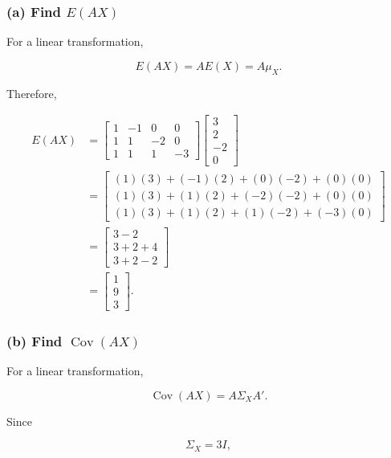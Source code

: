 \documentclass[12pt]{article}
\begin{document}
	\subsubsection*{(a) Find $E(AX)$}
	
	For a linear transformation,
	
	\[
	\boxed{
		E(AX)=AE(X)=A\mu_X
	}.
	\]
	
	Therefore,
	
	\[
	\begin{aligned}
		E(AX)
		&=
		\begin{bmatrix}
			1&-1&0&0\\
			1&1&-2&0\\
			1&1&1&-3
		\end{bmatrix}
		\begin{bmatrix}
			3\\
			2\\
			-2\\
			0
		\end{bmatrix}\\
		&=
		\begin{bmatrix}
			(1)(3)+(-1)(2)+(0)(-2)+(0)(0)\\
			(1)(3)+(1)(2)+(-2)(-2)+(0)(0)\\
			(1)(3)+(1)(2)+(1)(-2)+(-3)(0)
		\end{bmatrix}\\
		&=
		\begin{bmatrix}
			3-2\\
			3+2+4\\
			3+2-2
		\end{bmatrix}\\
		&=
		\boxed{
			\begin{bmatrix}
				1\\
				9\\
				3
			\end{bmatrix}
		}.
	\end{aligned}
	\]
	
	
	\subsubsection*{(b) Find $\operatorname{Cov}(AX)$}
	
	For a linear transformation,
	
	\[
	\boxed{
		\operatorname{Cov}(AX)=A\Sigma_XA'
	}.
	\]
	
	Since
	
	\[
	\Sigma_X=3I,
	\]
	
\end{document}
